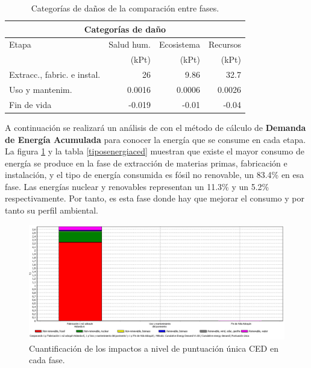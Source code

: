\begin{table}[!htb]
\centering
\begin{tabular}{p{6cm}rrr}
\toprule
\multicolumn{4}{c}{Categorías de daño}\\
\midrule
Etapa & Salud hum. & Ecosistema & Recursos\\
 & (kPt) & (kPt) & (kPt)\\
\midrule
Extracc., fabric. e instal. & 26 & 9.86 & 32.7\\
Uso y mantenim. & 0.0016 & 0.0006 & 0.0026 \\
Fin de vida & -0.019 & -0.01 & -0.04 \\
\bottomrule
\end{tabular}
\caption{Categorías de daños de la comparación entre fases.}
\label{categoriasdanoscompar}
\end{table}

A continuación se realizará un análisis de con el método de cálculo de \textbf{Demanda de Energía Acumulada} para conocer la energía que se consume en cada etapa. La figura \ref{fig:ced_puntuacionunica} y la tabla \ref{tiposenergiaced} muestran que existe el mayor consumo de energía se produce en la fase de extracción de materias primas, fabricación e instalación, y el tipo de energía consumida es fósil no renovable, un 83.4\% en esa fase. Las energías nuclear y renovables representan un 11.3\% y un 5.2\% respectivamente. Por tanto, es esta fase donde hay que mejorar el consumo y por tanto su perfil ambiental.


\begin{figure}[!htb]
\centering
\includegraphics[width=15cm]{img/ced_puntuacionunica.png}
\caption{Cuantificación de los impactos a nivel de puntuación única CED en cada fase.}
\label{fig:ced_puntuacionunica}
\end{figure}

